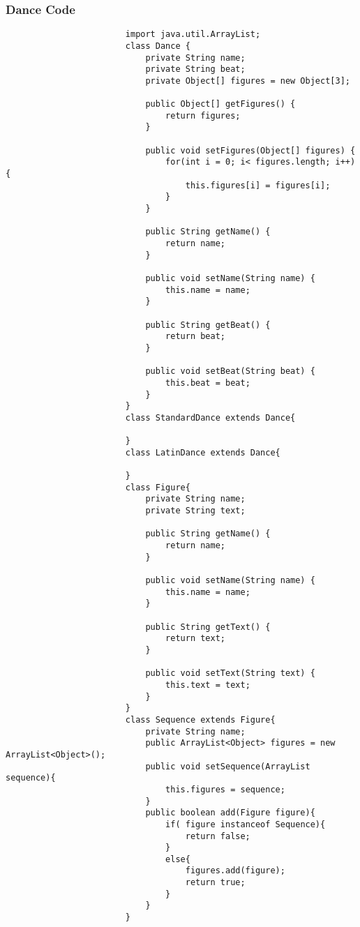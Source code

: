 \documentclass[12pt,a4paper,oneside,ngerman]{article}
\begin{document}
                \subsubsection{Dance Code}
                    \begin{verbatim}
						import java.util.ArrayList;
						class Dance {
							private String name;
							private String beat;
							private Object[] figures = new Object[3];
						
							public Object[] getFigures() {
								return figures;
							}
						
							public void setFigures(Object[] figures) {
								for(int i = 0; i< figures.length; i++){
									this.figures[i] = figures[i];
								}
							}
						
							public String getName() {
								return name;
							}
						
							public void setName(String name) {
								this.name = name;
							}
						
							public String getBeat() {
								return beat;
							}
						
							public void setBeat(String beat) {
								this.beat = beat;
							}
						}
						class StandardDance extends Dance{
						
						}
						class LatinDance extends Dance{
						
						}
						class Figure{
							private String name;
							private String text;
						
							public String getName() {
								return name;
							}
						
							public void setName(String name) {
								this.name = name;
							}
						
							public String getText() {
								return text;
							}
						
							public void setText(String text) {
								this.text = text;
							}
						}
						class Sequence extends Figure{
							private String name;
							public ArrayList<Object> figures = new ArrayList<Object>();
							public void setSequence(ArrayList sequence){
								this.figures = sequence;
							}
							public boolean add(Figure figure){
								if( figure instanceof Sequence){
									return false;
								}
								else{
									figures.add(figure);
									return true;
								}
							}
						}
					\end{verbatim}
\end{document}
